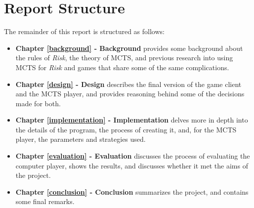 \section{Report Structure}
\label{reportStructure}

The remainder of this report is structured as follows:
\begin{itemize}
\item \textbf{Chapter \ref{background} - Background} provides some background about the rules of \textit{Risk}, the theory of MCTS, and previous research into using MCTS for \textit{Risk} and games that share some of the same complications.
\item \textbf{Chapter \ref{design} - Design} describes the final version of the game client and the MCTS player, and provides reasoning behind some of the decisions made for both.
\item \textbf{Chapter \ref{implementation} - Implementation} delves more in depth into the details of the program, the process of creating it, and, for the MCTS player, the parameters and strategies used.
\item \textbf{Chapter \ref{evaluation} - Evaluation} discusses the process of evaluating the computer player, shows the results, and discusses whether it met the aims of the project.
\item \textbf{Chapter \ref{conclusion} - Conclusion} summarizes the project, and contains some final remarks.
\end{itemize}